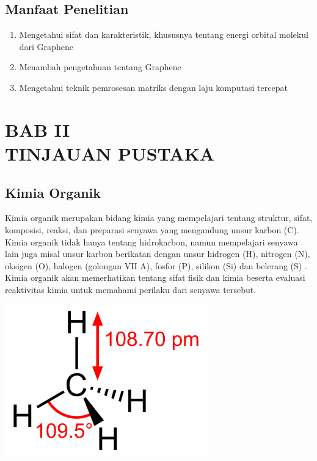 \documentclass[12pt,a4paper]{report}
\begin{document}
	\section{Manfaat Penelitian}
	\begin{enumerate}
		\item Mengetahui sifat dan karakteristik, khususnya tentang energi orbital molekul dari Graphene
		\item Menambah pengetahuan tentang Graphene
		\item Mengetahui teknik pemrosesan matriks dengan laju komputasi tercepat
	\end{enumerate}

\chapter*{BAB II \\ TINJAUAN PUSTAKA}
\setcounter{chapter}{2}
\setcounter{section}{0}
\setcounter{figure}{0}
\thispagestyle{myplain}
	\section{Kimia Organik}
	Kimia organik merupakan bidang kimia yang mempelajari tentang struktur, sifat, komposisi, reaksi, dan preparasi senyawa yang mengandung unsur karbon (C). Kimia organik tidak hanya tentang hidrokarbon, namun mempelajari senyawa lain juga misal unsur karbon berikatan dengan unsur hidrogen (H), nitrogen (N), oksigen (O), halogen (golongan VII A), fosfor (P), silikon (Si) dan belerang (S) \cite{ACS2020}. Kimia organik akan memerhatikan tentang sifat fisik dan kimia beserta evaluasi reaktivitas kimia untuk memahami perilaku dari senyawa tersebut.
	
	\begin{center}
		\includegraphics[width=8.75cm]{gambar/metana.png}
	\end{center}
\end{document}
